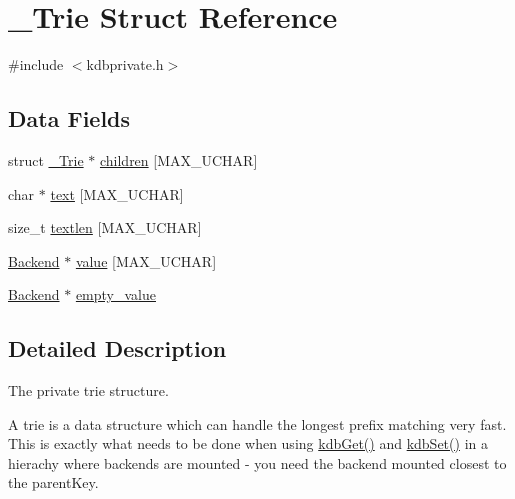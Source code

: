 \hypertarget{struct__Trie}{
\section{\_\-Trie Struct Reference}
\label{struct__Trie}
}


{\ttfamily \#include $<$kdbprivate.h$>$}

\subsection*{Data Fields}
\begin{DoxyCompactItemize}
\item 
struct \hyperlink{struct__Trie}{\_\-Trie} $\ast$ \hyperlink{struct__Trie_ae60b70484c5b75a76a9d936c7e6b9370}{children} \mbox{[}MAX\_\-UCHAR\mbox{]}
\item 
char $\ast$ \hyperlink{struct__Trie_af6bc274ad09ef18de2495bdcdf86d54f}{text} \mbox{[}MAX\_\-UCHAR\mbox{]}
\item 
size\_\-t \hyperlink{struct__Trie_ae1f924ab4e6d8c7eb8064d7eae21bf3f}{textlen} \mbox{[}MAX\_\-UCHAR\mbox{]}
\item 
\hyperlink{struct__Backend}{Backend} $\ast$ \hyperlink{struct__Trie_acc978e56b19aa3c483b4e54755697380}{value} \mbox{[}MAX\_\-UCHAR\mbox{]}
\item 
\hyperlink{struct__Backend}{Backend} $\ast$ \hyperlink{struct__Trie_ac5c6b4bddcccb23eb0bd26ffade7eb43}{empty\_\-value}
\end{DoxyCompactItemize}


\subsection{Detailed Description}
The private trie structure.

A trie is a data structure which can handle the longest prefix matching very fast. This is exactly what needs to be done when using \hyperlink{group__kdb_ga28e385fd9cb7ccfe0b2f1ed2f62453a1}{kdbGet()} and \hyperlink{group__kdb_ga11436b058408f83d303ca5e996832bcf}{kdbSet()} in a hierachy where backends are mounted -\/ you need the backend mounted closest to the parentKey. 

